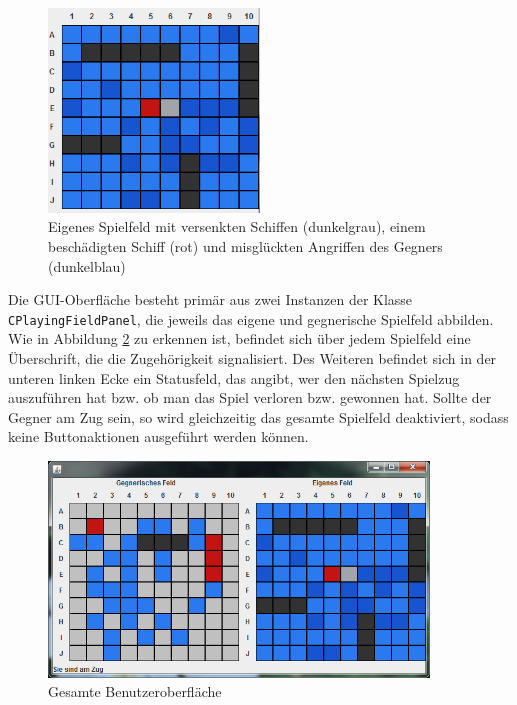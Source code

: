 \begin{figure}[H]
  \centering
  \includegraphics[width=0.5\textwidth]{images/JavaOwnPlayingFieldPanel.png}
  \caption{Eigenes Spielfeld mit versenkten Schiffen (dunkelgrau), einem beschädigten Schiff (rot) und misglückten Angriffen des Gegners (dunkelblau)}
  \label{fig:EigenesSpielfeldpanel}
\end{figure}

Die GUI-Oberfläche besteht primär aus zwei Instanzen der Klasse \texttt{CPlayingFieldPanel}, die jeweils das eigene und gegnerische Spielfeld abbilden.
Wie in Abbildung \ref{fig:GUI} zu erkennen ist, befindet sich über jedem Spielfeld eine Überschrift, die die Zugehörigkeit signalisiert.
Des Weiteren befindet sich in der unteren linken Ecke ein Statusfeld, das angibt, wer den nächsten Spielzug auszuführen hat bzw. ob man das Spiel verloren bzw. gewonnen hat.
Sollte der Gegner am Zug sein, so wird gleichzeitig das gesamte Spielfeld deaktiviert, sodass keine Buttonaktionen ausgeführt werden können.

\begin{figure}[H]
  \centering
  \includegraphics[width=0.9\textwidth]{images/JavaClientGUI.png}
  \caption{Gesamte Benutzeroberfläche}
  \label{fig:GUI}
\end{figure}

